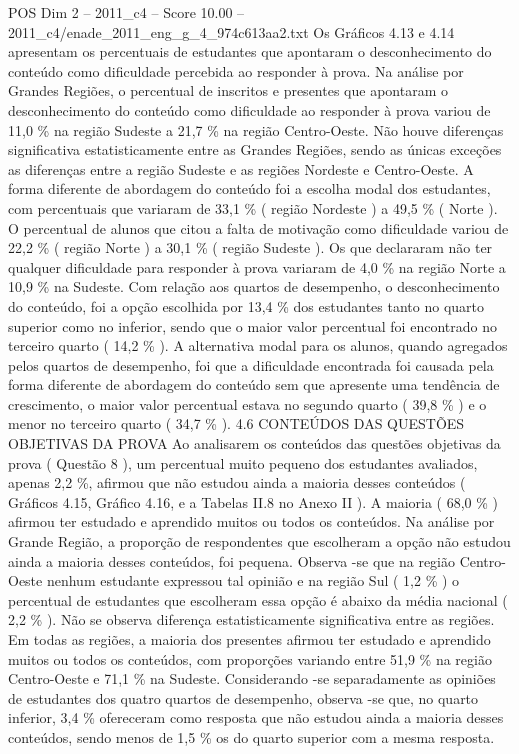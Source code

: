 \begin{textsample}{POS Dim 2 – 2011\_c4 – Score 10.00 – 2011\_c4/enade\_2011\_eng\_g\_4\_974c613aa2.txt}
Os Gráficos 4.13 e 4.14 apresentam os percentuais de estudantes que apontaram o desconhecimento do conteúdo como dificuldade percebida ao responder à prova.
Na análise por Grandes Regiões, o percentual de inscritos e presentes que apontaram o desconhecimento do conteúdo como dificuldade ao responder à prova variou de 11,0 \% na região Sudeste a 21,7 \% na região Centro-Oeste.
Não houve diferenças significativa estatisticamente entre as Grandes Regiões, sendo as únicas exceções as diferenças entre a região Sudeste e as regiões Nordeste e Centro-Oeste.
A forma diferente de abordagem do conteúdo foi a escolha modal dos estudantes, com percentuais que variaram de 33,1 \% ( região Nordeste ) a 49,5 \% ( Norte ).
O percentual de alunos que citou a falta de motivação como dificuldade variou de 22,2 \% ( região Norte ) a 30,1 \% ( região Sudeste ).
Os que declararam não ter qualquer dificuldade para responder à prova variaram de 4,0 \% na região Norte a 10,9 \% na Sudeste.
Com relação aos quartos de desempenho, o desconhecimento do conteúdo, foi a opção escolhida por 13,4 \% dos estudantes tanto no quarto superior como no inferior, sendo que o maior valor percentual foi encontrado no terceiro quarto ( 14,2 \% ).
A alternativa modal para os alunos, quando agregados pelos quartos de desempenho, foi que a dificuldade encontrada foi causada pela forma diferente de abordagem do conteúdo sem que apresente uma tendência de crescimento, o maior valor percentual estava no segundo quarto ( 39,8 \% ) e o menor no terceiro quarto ( 34,7 \% ). 4.6 CONTEÚDOS DAS QUESTÕES OBJETIVAS DA PROVA Ao analisarem os conteúdos das questões objetivas da prova ( Questão 8 ), um percentual muito pequeno dos estudantes avaliados, apenas 2,2 \%, afirmou que não estudou ainda a maioria desses conteúdos ( Gráficos 4.15, Gráfico 4.16, e a Tabelas II.8 no Anexo II ).
A maioria ( 68,0 \% ) afirmou ter estudado e aprendido muitos ou todos os conteúdos.
Na análise por Grande Região, a proporção de respondentes que escolheram a opção não estudou ainda a maioria desses conteúdos, foi pequena.
Observa -se que na região Centro-Oeste nenhum estudante expressou tal opinião e na região Sul ( 1,2 \% ) o percentual de estudantes que escolheram essa opção é abaixo da média nacional ( 2,2 \% ).
Não se observa diferença estatisticamente significativa entre as regiões.
Em todas as regiões, a maioria dos presentes afirmou ter estudado e aprendido muitos ou todos os conteúdos, com proporções variando entre 51,9 \% na região Centro-Oeste e 71,1 \% na Sudeste.
Considerando -se separadamente as opiniões de estudantes dos quatro quartos de desempenho, observa -se que, no quarto inferior, 3,4 \% ofereceram como resposta que não estudou ainda a maioria desses conteúdos, sendo menos de 1,5 \% os do quarto superior com a mesma resposta.

\end{textsample}
